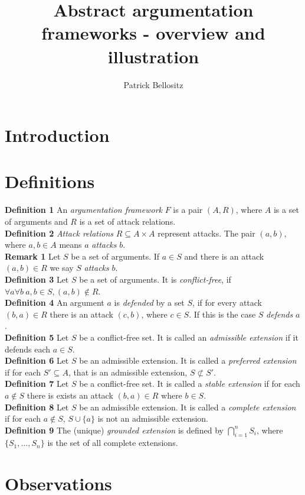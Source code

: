 \documentclass{article}
\newcommand{\nl}{\\[6pt]}
\begin{document}
\title{Abstract argumentation frameworks - overview and illustration}
\author{Patrick Bellositz}
\date{}
\maketitle

\section{Introduction}

\section{Definitions}
\textbf{Definition 1} An \emph{argumentation framework} $F$ is a pair $(A,R)$, where $A$ is a set of arguments and $R$ is a set of attack relations.\nl
\textbf{Definition 2} \emph{Attack relations} $R\subseteq A\times A$ represent attacks. The pair $(a,b)$, where $a,b\in A$ means $a$ \emph{attacks} $b$.\nl
\textbf{Remark 1} Let $S$ be a set of arguments. If $a\in S$ and there is an attack $(a,b)\in R$ we say $S$ \emph{attacks} $b$.\nl
\textbf{Definition 3} Let $S$ be a set of arguments. It is \emph{conflict-free}, if $\forall a \forall b\ a,b\in S, (a,b)\notin R$.\nl
\textbf{Definition 4} An argument $a$ is \emph{defended} by a set $S$, if for every attack $(b,a)\in R$ there is an attack $(c,b)$, where $c\in S$. If this is the case $S$ \emph{defends} $a$.\nl
\textbf{Definition 5} Let $S$ be a conflict-free set. It is called an \emph{admissible extension} if it defends each $a\in S$.\nl
\textbf{Definition 6} Let $S$ be an admissible extension. It is called a \emph{preferred extension} if for each $S'\subseteq A$, that is an admissible extension, $S\not\subset S'$.\nl
\textbf{Definition 7} Let $S$ be a conflict-free set. It is called a \emph{stable extension} if for each $a\not\in S$ there is exists an attack $(b,a)\in R$ where $b\in S$.\nl
\textbf{Definition 8} Let $S$ be an admissible extension. It is called a \emph{complete extension} if for each $a\not\in S$, $S\cup \{a\}$ is not an admissible extension.\nl
\textbf{Definition 9} The (unique) \emph{grounded extension} is defined by $\bigcap\limits_{i=1}^n{S_i}$, where $\{S_1,...,S_n\}$ is the set of all complete extensions.\nl

\section{Observations}
\end{document}
